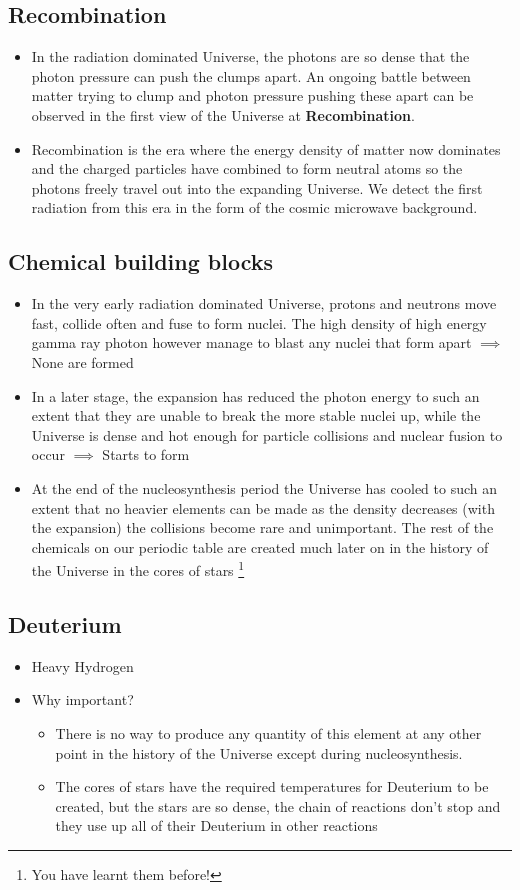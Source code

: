 \documentclass{article}
\begin{document}
\subsection{Recombination}
\begin{itemize}
\item In the radiation dominated Universe, the photons are so dense that the
photon pressure can push the clumps apart. An ongoing battle between matter trying to clump
and photon pressure pushing these apart can be observed in the first view of the Universe at
\textbf{Recombination}.
\item Recombination is the era where the energy density of matter now dominates and the charged
particles have combined to form neutral atoms so the photons freely travel out into the expanding
Universe. We detect the first radiation from this era in the form of the cosmic microwave
background.
\end{itemize}
\subsection{Chemical building blocks}
\begin{itemize}
\item In the very early radiation dominated Universe, protons and neutrons move fast, collide often and fuse to form nuclei. The high density of high energy gamma ray photon however manage to
blast any nuclei that form apart $\implies$ None are formed
\item In a later stage, the expansion has reduced the photon energy to such an extent that they are unable to break the more stable nuclei up, while the Universe is dense and hot
enough for particle collisions and nuclear fusion to occur $\implies$ Starts to form
\item At the end of the nucleosynthesis period the Universe has cooled to such an extent that no
heavier elements can be made as the density decreases (with the expansion) the collisions
become rare and unimportant. The rest of the chemicals on our periodic table are created much
later on in the history of the Universe in the cores of stars \footnote{You have learnt them before!}
\end{itemize}
\subsection{Deuterium}
\begin{itemize}
\item Heavy Hydrogen 
\item Why important?
\begin{itemize}
\item There is no way to produce any quantity of this element at
any other point in the history of the Universe except during nucleosynthesis.
\item  The cores of stars have the required temperatures for Deuterium to be created, but the stars are so dense, the chain of reactions don’t stop and they use up all of their Deuterium in other reactions
\end{itemize}
\end{itemize}
\end{document}
